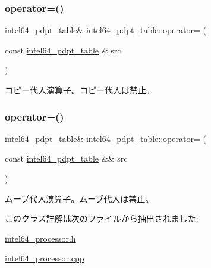 \subsubsection{\texorpdfstring{operator=()}{operator=()}\hspace{0.1cm}{\footnotesize\ttfamily [1/2]}}
{\footnotesize\ttfamily \hyperlink{classintel64__pdpt__table}{intel64\+\_\+pdpt\+\_\+table}\& intel64\+\_\+pdpt\+\_\+table\+::operator= (\begin{DoxyParamCaption}\item[{const \hyperlink{classintel64__pdpt__table}{intel64\+\_\+pdpt\+\_\+table} \&}]{src }\end{DoxyParamCaption})\hspace{0.3cm}{\ttfamily [delete]}}

コピー代入演算子。コピー代入は禁止。 \hypertarget{classintel64__pdpt__table_a6f2a9aa341261354835c89972c341007}{}\label{classintel64__pdpt__table_a6f2a9aa341261354835c89972c341007} 
\subsubsection{\texorpdfstring{operator=()}{operator=()}\hspace{0.1cm}{\footnotesize\ttfamily [2/2]}}
{\footnotesize\ttfamily \hyperlink{classintel64__pdpt__table}{intel64\+\_\+pdpt\+\_\+table}\& intel64\+\_\+pdpt\+\_\+table\+::operator= (\begin{DoxyParamCaption}\item[{const \hyperlink{classintel64__pdpt__table}{intel64\+\_\+pdpt\+\_\+table} \&\&}]{src }\end{DoxyParamCaption})\hspace{0.3cm}{\ttfamily [delete]}}

ムーブ代入演算子。ムーブ代入は禁止。 

このクラス詳解は次のファイルから抽出されました\+:\begin{DoxyCompactItemize}
\item 
\hyperlink{intel64__processor_8h}{intel64\+\_\+processor.\+h}\item 
\hyperlink{intel64__processor_8cpp}{intel64\+\_\+processor.\+cpp}\end{DoxyCompactItemize}

